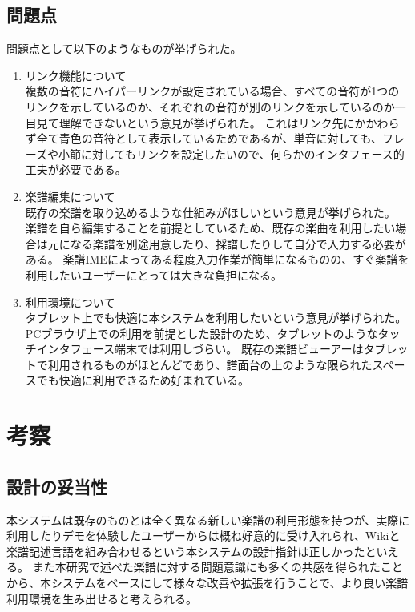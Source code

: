 \subsection{問題点}
問題点として以下のようなものが挙げられた。
\begin{enumerate}
    \item リンク機能について\\
    複数の音符にハイパーリンクが設定されている場合、すべての音符が1つのリンクを示しているのか、それぞれの音符が別のリンクを示しているのか一目見て理解できないという意見が挙げられた。
    これはリンク先にかかわらず全て青色の音符として表示しているためであるが、単音に対しても、フレーズや小節に対してもリンクを設定したいので、何らかのインタフェース的工夫が必要である。
    \item 楽譜編集について\\
    既存の楽譜を取り込めるような仕組みがほしいという意見が挙げられた。
    楽譜を自ら編集することを前提としているため、既存の楽曲を利用したい場合は元になる楽譜を別途用意したり、採譜したりして自分で入力する必要がある。
    楽譜IMEによってある程度入力作業が簡単になるものの、すぐ楽譜を利用したいユーザーにとっては大きな負担になる。
    \item 利用環境について\\
    タブレット上でも快適に本システムを利用したいという意見が挙げられた。
    PCブラウザ上での利用を前提とした設計のため、タブレットのようなタッチインタフェース端末では利用しづらい。
    既存の楽譜ビューアーはタブレットで利用されるものがほとんどであり、譜面台の上のような限られたスペースでも快適に利用できるため好まれている。
\end{enumerate}

\section{考察}
\subsection{設計の妥当性}
本システムは既存のものとは全く異なる新しい楽譜の利用形態を持つが、実際に利用したりデモを体験したユーザーからは概ね好意的に受け入れられ、Wikiと楽譜記述言語を組み合わせるという本システムの設計指針は正しかったといえる。
また本研究で述べた楽譜に対する問題意識にも多くの共感を得られたことから、本システムをベースにして様々な改善や拡張を行うことで、より良い楽譜利用環境を生み出せると考えられる。
